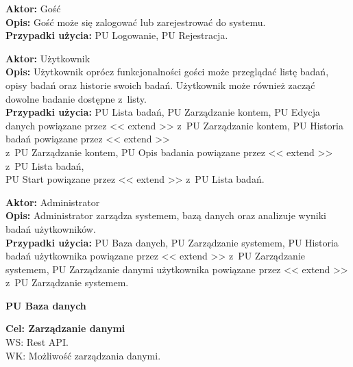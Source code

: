 \documentclass[12pt, letterpaper]{article}
\begin{document}
		\textbf{Aktor:} Gość\\
		
		\textbf{Opis:} Gość może się zalogować lub zarejestrować do systemu.\\
		
		\textbf{Przypadki użycia:} PU Logowanie, PU Rejestracja.
		
		\vspace{1cm}
		
		\textbf{Aktor:} Użytkownik\\
		
		\textbf{Opis:} Użytkownik oprócz funkcjonalności gości może przeglądać listę badań, opisy badań oraz historie swoich badań. Użytkownik może również zacząć dowolne badanie dostępne z~listy.\\
		
		\textbf{Przypadki użycia:} PU Lista badań, PU Zarządzanie kontem, PU Edycja danych powiązane przez << extend >> z~PU Zarządzanie kontem, PU Historia badań powiązane przez << extend >>\\ z~PU Zarządzanie kontem, PU Opis badania powiązane przez << extend >> z~PU Lista badań,\\ PU Start powiązane przez << extend >> z~PU Lista badań. 
		
		\vspace{1cm}
		
		\textbf{Aktor:} Administrator\\
		
		\textbf{Opis:} Administrator zarządza systemem, bazą danych oraz analizuje wyniki badań użytkowników.\\
		
		\textbf{Przypadki użycia:} PU Baza danych, PU Zarządzanie systemem, PU Historia badań użytkownika powiązane przez << extend >> z~PU Zarządzanie systemem, PU Zarządzanie danymi użytkownika powiązane przez << extend >> z~PU Zarządzanie systemem.	

		
		
		\textbf{PU Baza danych}
		
		\quad
		
		\textbf{Cel: Zarządzanie danymi}\\
		
		WS: Rest API.\\
		
		WK: Możliwość zarządzania danymi.\\
		
\end{document}

